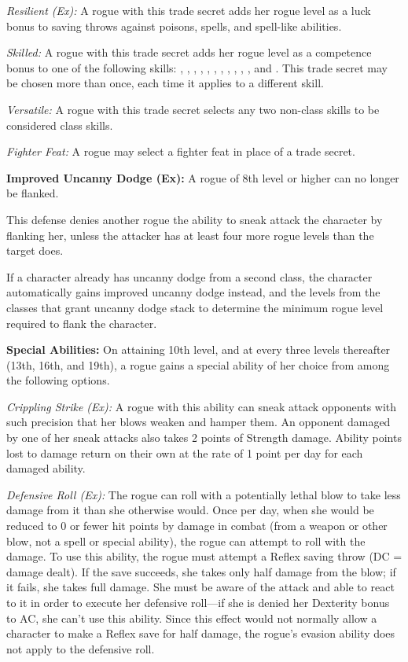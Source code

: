 \textit{Resilient (Ex):} A rogue with this trade secret adds \onehalf her rogue level as a luck bonus to saving throws against poisons, spells, and spell-like abilities.

\textit{Skilled:} A rogue with this trade secret adds \onequarter her rogue level as a competence bonus to one of the following skills: , , , , , , , , , , , and . This trade secret may be chosen more than once, each time it applies to a different skill.

\textit{Versatile:} A rogue with this trade secret selects any two non-class skills to be considered class skills.

\textit{Fighter Feat:} A rogue may select a fighter feat in place of a trade secret.

\textbf{Improved Uncanny Dodge (Ex):} A rogue of 8th level or higher can no longer be flanked.

This defense denies another rogue the ability to sneak attack the character by flanking her, unless the attacker has at least four more rogue levels than the target does.

If a character already has uncanny dodge from a second class, the character automatically gains improved uncanny dodge instead, and the levels from the classes that grant uncanny dodge stack to determine the minimum rogue level required to flank the character.

\textbf{Special Abilities:} On attaining 10th level, and at every three levels thereafter (13th, 16th, and 19th), a rogue gains a special ability of her choice from among the following options.

\textit{Crippling Strike (Ex):} A rogue with this ability can sneak attack opponents with such precision that her blows weaken and hamper them. An opponent damaged by one of her sneak attacks also takes 2 points of Strength damage. Ability points lost to damage return on their own at the rate of 1 point per day for each damaged ability.

\textit{Defensive Roll (Ex):} The rogue can roll with a potentially lethal blow to take less damage from it than she otherwise would. Once per day, when she would be reduced to 0 or fewer hit points by damage in combat (from a weapon or other blow, not a spell or special ability), the rogue can attempt to roll with the damage. To use this ability, the rogue must attempt a Reflex saving throw (DC = damage dealt). If the save succeeds, she takes only half damage from the blow; if it fails, she takes full damage. She must be aware of the attack and able to react to it in order to execute her defensive roll---if she is denied her Dexterity bonus to AC, she can't use this ability. Since this effect would not normally allow a character to make a Reflex save for half damage, the rogue's evasion ability does not apply to the defensive roll.

